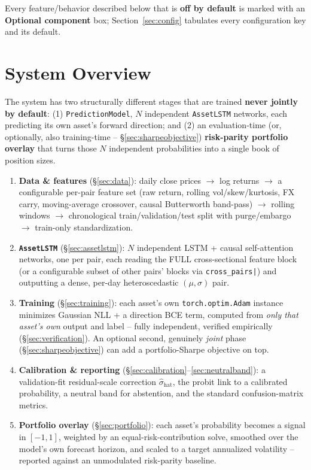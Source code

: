 \documentclass[11pt]{article}
\begin{document}
Every feature/behavior described below that is \textbf{off by default} is marked with an
\textbf{Optional component} box; Section~\ref{sec:config} tabulates every configuration key
and its default.

\section{System Overview}
\label{sec:overview}

The system has two structurally different stages that are trained \textbf{never jointly by
default}: (1) \texttt{PredictionModel}, $N$ independent \texttt{AssetLSTM} networks, each
predicting its own asset's forward direction; and (2) an evaluation-time (or, optionally,
also training-time -- \S\ref{sec:sharpeobjective}) \textbf{risk-parity portfolio overlay}
that turns those $N$ independent probabilities into a single book of position sizes.

\begin{enumerate}[label=\textbf{Stage \arabic*.}, leftmargin=2.2cm]
  \item \textbf{Data \& features} (\S\ref{sec:data}): daily close prices $\to$ log returns
    $\to$ a configurable per-pair feature set (raw return, rolling vol/skew/kurtosis, FX
    carry, moving-average crossover, causal Butterworth band-pass) $\to$ rolling windows
    $\to$ chronological train/validation/test split with purge/embargo $\to$
    train-only standardization.
  \item \textbf{\texttt{AssetLSTM}} (\S\ref{sec:assetlstm}): $N$ independent LSTM + causal
    self-attention networks, one per pair, each reading the FULL cross-sectional feature
    block (or a configurable subset of other pairs' blocks via \texttt{cross\_pairs|}) and
    outputting a dense, per-day heteroscedastic $(\mu,\sigma)$ pair.
  \item \textbf{Training} (\S\ref{sec:training}): each asset's own \texttt{torch.optim.Adam}
    instance minimizes Gaussian NLL + a direction BCE term, computed from \emph{only that
    asset's own} output and label -- fully independent, verified empirically
    (\S\ref{sec:verification}). An optional second, genuinely \emph{joint} phase
    (\S\ref{sec:sharpeobjective}) can add a portfolio-Sharpe objective on top.
  \item \textbf{Calibration \& reporting} (\S\ref{sec:calibration}--\ref{sec:neutralband}):
    a validation-fit residual-scale correction $\hat\sigma_{\text{hat}}$, the probit link to
    a calibrated probability, a neutral band for abstention, and the standard
    confusion-matrix metrics.
  \item \textbf{Portfolio overlay} (\S\ref{sec:portfolio}): each asset's probability becomes
    a signal in $[-1,1]$, weighted by an equal-risk-contribution solve, smoothed over the
    model's own forecast horizon, and scaled to a target annualized volatility -- reported
    against an unmodulated risk-parity baseline.
\end{enumerate}
\end{document}
